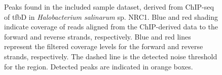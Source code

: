 \documentclass{bioinfo}
\begin{document}

\begin{figure}[!tfbd data - reasonable spot showing curation]%
  \begin{center}
    {}
    {}
  \end{center}
  \caption{Peaks found in the included sample dataset, derived from
    ChIP-seq of tfbD in {\em Halobacterium salinarum} sp. NRC1. Blue
    and red shading indicate coverage of reads aligned from the
    ChIP-derived data to the forward and reverse strands,
    respectively. Blue and red lines represent the filtered coverage
    levels for the forward and reverse strands, respectively. The
    dashed line is the detected noise threshold for the
    region. Detected peaks are indicated in orange
    boxes.}\label{fig:02}
\end{figure}
\end{document}
